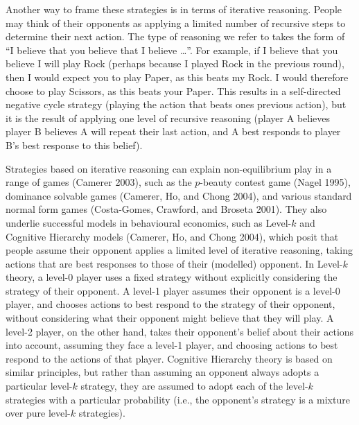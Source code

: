 \documentclass[smallextended]{svjour3}       %
\begin{document}
Another way to frame these strategies is in terms of iterative
reasoning. People may think of their opponents as applying a limited
number of recursive steps to determine their next action. The type of
reasoning we refer to takes the form of ``I believe that you believe
that I believe \ldots{}''. For example, if I believe that you believe I
will play Rock (perhaps because I played Rock in the previous round),
then I would expect you to play Paper, as this beats my Rock. I would
therefore choose to play Scissors, as this beats your Paper. This
results in a self-directed negative cycle strategy (playing the action
that beats ones previous action), but it is the result of applying one
level of recursive reasoning (player A believes player B believes A will
repeat their last action, and A best responds to player B's best
response to this belief).

Strategies based on iterative reasoning can explain non-equilibrium play
in a range of games (Camerer 2003), such as the \(p\)-beauty contest
game (Nagel 1995), dominance solvable games (Camerer, Ho, and Chong
2004), and various standard normal form games (Costa-Gomes, Crawford,
and Broseta 2001). They also underlie successful models in behavioural
economics, such as Level-\(k\) and Cognitive Hierarchy models (Camerer,
Ho, and Chong 2004), which posit that people assume their opponent
applies a limited level of iterative reasoning, taking actions that are
best responses to those of their (modelled) opponent. In Level-\(k\)
theory, a level-0 player uses a fixed strategy without explicitly
considering the strategy of their opponent. A level-1 player assumes
their opponent is a level-0 player, and chooses actions to best respond
to the strategy of their opponent, without considering what their
opponent might believe that they will play. A level-2 player, on the
other hand, takes their opponent's belief about their actions into
account, assuming they face a level-1 player, and choosing actions to
best respond to the actions of that player. Cognitive Hierarchy theory
is based on similar principles, but rather than assuming an opponent
always adopts a particular level-\(k\) strategy, they are assumed to
adopt each of the level-\(k\) strategies with a particular probability
(i.e., the opponent's strategy is a mixture over pure level-\(k\)
strategies).
\end{document}

